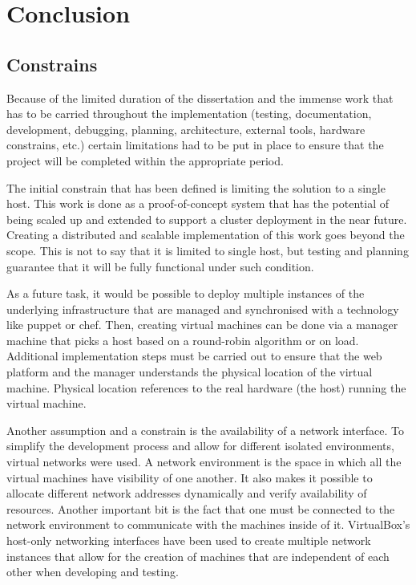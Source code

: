 \documentclass{article}
\begin{document}
\newpage
\section{Conclusion}

\subsection{Constrains}
Because of the limited duration of the dissertation and the immense work that has to be carried throughout the implementation (testing, documentation, development, debugging, planning, architecture, external tools, hardware constrains, etc.) certain limitations had to be put in place to ensure that the project will be completed within the appropriate period.

The initial constrain that has been defined is limiting the solution to a single host. This work is done as a proof-of-concept system that has the potential of being scaled up and extended to support a cluster deployment in the near future.
Creating a distributed and scalable implementation of this work goes beyond the scope. This is not to say that it is limited to single host, but testing and planning guarantee that it will be fully functional under such condition.

As a future task, it would be possible to deploy multiple instances of the underlying infrastructure that are managed and synchronised with a technology like puppet or chef. Then, creating virtual machines can be done via a manager machine that picks a host based on a round-robin algorithm or on load. Additional implementation steps must be carried out to ensure that the web platform and the manager understands the physical location of the virtual machine. Physical location references to the real hardware (the host) running the virtual machine.

Another assumption and a constrain is the availability of a network interface. To simplify the development process and allow for  different isolated environments, virtual networks were used. A network environment is the space in which all the virtual machines have visibility of one another. It also makes it possible to allocate different network addresses dynamically and verify availability of resources. Another important bit is the fact that one must be connected to the network environment to communicate with the machines inside of it. VirtualBox's host-only networking interfaces have been used to create multiple network instances that allow for the creation of machines that are independent of each other when developing and testing.
\end{document}
